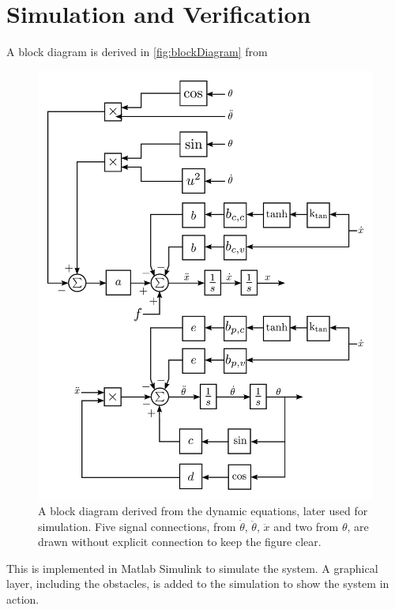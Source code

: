 \section{Simulation and Verification}

A block diagram is derived in \autoref{fig:blockDiagram} from %

\begin{figure}[H]
  \includegraphics[width=.7\textwidth]{figures/blockDiagramWithFriction}
  \caption{A block diagram derived from the dynamic equations, later used for simulation. Five signal connections, from $\dot{\theta}$, $\ddot{\theta}$, $\ddot{x}$ and two from $\theta$, are drawn without explicit connection to keep the figure clear.}
  \label{fig:blockDiagram}
\end{figure}

This is implemented in Matlab Simulink to simulate the system. A graphical layer, including the obstacles, is added to the simulation to show the system in action.